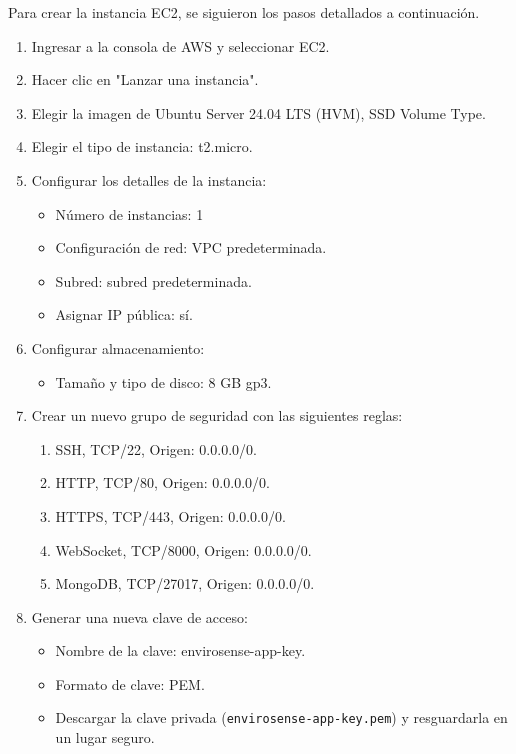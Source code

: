 Para crear la instancia EC2, se siguieron los pasos detallados a continuación.

\begin{enumerate}
    \item Ingresar a la consola de AWS y seleccionar EC2.
    \item Hacer clic en "Lanzar una instancia".
    \item Elegir la imagen de Ubuntu Server 24.04 LTS (HVM), SSD Volume Type.
    \item Elegir el tipo de instancia: t2.micro.
    \item Configurar los detalles de la instancia:
          \begin{itemize}
              \item Número de instancias: 1
              \item Configuración de red: VPC predeterminada.
              \item Subred: subred predeterminada.
              \item Asignar IP pública: sí.
          \end{itemize}
    \item Configurar almacenamiento:
          \begin{itemize}
              \item Tamaño y tipo de disco: 8 GB gp3.
          \end{itemize}
    \item Crear un nuevo grupo de seguridad con las siguientes reglas:
          \begin{enumerate}
              \item SSH, TCP/22, Origen: 0.0.0.0/0.
              \item HTTP, TCP/80, Origen: 0.0.0.0/0.
              \item HTTPS, TCP/443, Origen: 0.0.0.0/0.
              \item WebSocket, TCP/8000, Origen: 0.0.0.0/0.
              \item MongoDB, TCP/27017, Origen: 0.0.0.0/0.
          \end{enumerate}
    \item Generar una nueva clave de acceso:
          \begin{itemize}
              \item Nombre de la clave: envirosense-app-key.
              \item Formato de clave: PEM.
              \item Descargar la clave privada (\texttt{envirosense-app-key.pem}) y resguardarla en
                    un lugar seguro.
          \end{itemize}
\end{enumerate}

